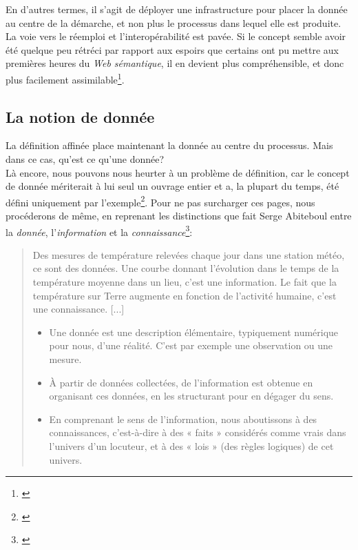 \documentclass[a4paper,12pt,twoside]{book}
\begin{document}
En d'autres termes, il s'agit de déployer une infrastructure pour placer la donnée au centre de la démarche, et non plus le processus dans lequel elle est produite. La voie vers le réemploi et l'interopérabilité est pavée. Si le concept semble avoir été quelque peu \og rétréci \fg{} par rapport aux espoirs que certains ont pu mettre aux premières heures du \textit{Web sémantique}, il en devient plus compréhensible, et donc plus facilement assimilable\footnote{\cite[p.~23]{amarBienvenueDansGigantesque2011}}.\\

\subsection{La notion de donnée}

La définition affinée place maintenant la donnée au centre du processus. Mais dans ce cas, qu'est ce qu'une donnée?\\

Là encore, nous pouvons nous heurter à un problème de définition, car \og le concept de donnée mériterait à lui seul un ouvrage entier \fg{} et a, la plupart du temps, été défini uniquement par l'exemple\footnote{\cite[p.~41]{borgmanQuEstceQue2020}}. Pour ne pas surcharger ces pages, nous procéderons de même, en reprenant les distinctions que fait Serge Abiteboul entre la \textit{donnée}, l'\textit{information} et la \textit{connaissance}\footnote{\cite{abiteboulSciencesDonneesLogique2012}}: 
\begin{quotation}
    \og Des mesures de température relevées chaque jour dans une station météo, ce sont des données. Une courbe donnant l’évolution dans le temps de la température moyenne dans un lieu, c’est une information. Le fait que la température sur Terre augmente en fonction de l’activité humaine, c’est une connaissance.
    [...]
    \begin{itemize}
        \item Une donnée est une description élémentaire, typiquement numérique pour nous, d’une réalité. C’est par exemple une observation ou une mesure.        
        \item À partir de données collectées, de l’information est obtenue en organisant ces données, en les structurant pour en dégager du sens.        
        \item En comprenant le sens de l’information, nous aboutissons à des connaissances, c’est-à-dire à des « faits » considérés comme vrais dans l’univers d’un locuteur, et à des « lois » (des règles logiques) de cet univers.\fg{}
    \end{itemize}
\end{quotation}
\end{document}
